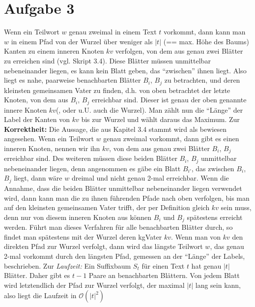 \documentclass[a4paper,10pt,oneside,leqno]{scrartcl}
\begin{document}
\section*{Aufgabe 3}
Wenn ein Teilwort $w$ genau zweimal in einem Text $t$ vorkommt, dann kann man $w$ in einem Pfad von der Wurzel über weniger als $|t|$ (== max. Höhe des Baums)
Kanten zu einem inneren Knoten $kv$ verfolgen, von dem aus genau zwei Blätter zu erreichen sind (vgl. Skript 3.4). Diese Blätter müssen unmittelbar nebeneinander liegen,
es kann kein Blatt geben, das ``zwischen'' ihnen liegt. Also liegt es nahe, paarweise benachbarten Blätter $B_i$, $B_j$ zu betrachten, und deren kleinsten gemeinsamen Vater zu finden,
d.h. von oben betrachtet der letzte Knoten, von dem aus $B_i$, $B_j$ erreichbar sind. Dieser ist genau der oben genannte innere Knoten $kv$(, oder u.U. auch die Wurzel). Man zählt
nun die ``Länge'' der Label der Kanten von $kv$ bis zur Wurzel und wählt daraus das Maximum.\newline
Zur \textbf{Korrektheit:} Die Aussage, die aus Kapitel 3.4 stammt wird als bewiesen angesehen. Wenn ein Teilwort $w$ genau zweimal vorkommt, dann gibt es einen inneren Knoten, nennen
wir ihn $kv$, von dem aus genau zwei Blätter $B_i$, $B_j$ erreichbar sind. Des weiteren müssen diese beiden Blätter $B_i$, $B_j$ unmittelbar nebeneinander liegen, denn angenommen es
gäbe ein Blatt $B_{i'}$, das zwischen $B_i$, $B_j$ liegt, dann wäre $w$ dreimal und nicht genau 2-mal erreichbar. Wenn die Annahme, dass die beiden Blätter unmittelbar nebeneinander
liegen verwendet wird, dann kann man die zu ihnen führenden Pfade nach oben verfolgen, bis man auf den kleinsten gemeinsamen Vater trifft, der per Definition gleich $kv$ sein muss,
denn nur von diesem inneren Knoten aus können $B_i$ und $B_j$ spätestens erreicht werden. Führt man dieses Verfahren für alle benachbarten Blätter durch, so findet man spätestens mit
der Wurzel deren kgVater $kv$. Wenn man von $kv$ den direkten Pfad zur Wurzel verfolgt, dann wird das längste Teilwort $w$, das genau 2-mal vorkommt durch den längsten Pfad,
gemessen an der ``Länge'' der Labels, beschrieben.\newline
Zur \textit{Laufzeit:} Ein Suffixbaum $S_t$ für einen Text $t$ hat genau $|t|$ Blätter. Daher gibt es $t-1$ Paare an benachbarten Blättern. Von jedem Blatt wird letztendlich der Pfad
zur Wurzel verfolgt, der maximal $|t|$ lang sein kann, also liegt die Laufzeit in $\mathcal{O}(|t|^2)$
\end{document}
